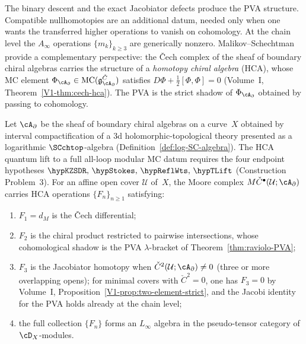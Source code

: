 The binary descent and the exact Jacobiator defects produce the PVA
structure. Compatible nullhomotopies are an additional datum, needed
only when one wants the transferred higher operations to vanish on
cohomology. At the chain level the $A_\infty$ operations
$\{m_k\}_{k \geq 3}$ are generically nonzero. Malikov--Schechtman~\cite{MS24}
provide a complementary perspective: the \v{C}ech complex of the sheaf
of boundary chiral algebras carries the structure of a
\emph{homotopy chiral algebra} (HCA), whose MC element
$\Phi_{\cA_\partial} \in \operatorname{MC}(\mathfrak{g}^{\check{C}}_{\cA_\partial})$
satisfies $D\Phi + \tfrac{1}{2}[\Phi,\Phi] = 0$
(Volume~I, Theorem~\ref{V1-thm:cech-hca}). The PVA is the strict
shadow of $\Phi_{\cA_\partial}$ obtained by passing to cohomology.

\begin{conjecture}
Let $\cA_\partial$ be the sheaf of boundary chiral algebras on a
curve~$X$ obtained by interval compactification of a 3d
holomorphic-topological theory presented as a logarithmic
$\SCchtop$-algebra (Definition~\ref{def:log-SC-algebra}). The HCA
quantum lift to a full all-loop modular MC datum requires the four
endpoint hypotheses
$\hypKZSDR,\,\hypStokes,\,\hypReflWts,\,\hypTLift$
(Construction Problem~3).
For an affine open cover $\mathcal{U}$ of~$X$,
the Moore complex $M\check{C}^\bullet(\mathcal{U};\cA_\partial)$
carries HCA operations $\{F_n\}_{n \geq 1}$ satisfying:
\begin{enumerate}[label=\textup{(\roman*)}]
\item $F_1 = d_M$ is the \v{C}ech differential;
\item $F_2$ is the chiral product restricted to pairwise intersections,
 whose cohomological shadow is the PVA $\lambda$-bracket
 of Theorem~\textup{\ref{thm:raviolo-PVA}};
\item $F_3$ is the Jacobiator homotopy when
 $\check{C}^2(\mathcal{U};\cA_\partial) \neq 0$
 \textup{(}three or more overlapping opens\textup{)};
 for minimal covers with $\check{C}^2 = 0$, one has $F_3 = 0$
 by Volume~I, Proposition~\textup{\ref{V1-prop:two-element-strict}},
 and the Jacobi identity for the PVA holds already at the chain
 level;
\item the full collection $\{F_n\}$ forms an $L_\infty$ algebra in
 the pseudo-tensor category of $\cD_X$-modules.
\end{enumerate}
\end{conjecture}

